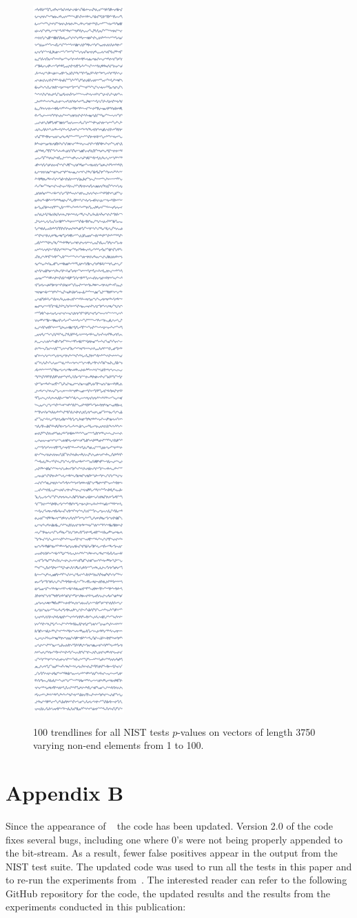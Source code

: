 \documentclass[oneside,12pt]{amsart}
\theoremstyle{definition}
\numberwithin{equation}{section}
\begin{document}
\begin{figure}[h!]
\centering
\caption{100 trendlines for all NIST tests $p$-values on vectors of length 3750 varying non-end elements from 1 to 100.}
\includegraphics[width=0.2\linewidth, height=1.2\linewidth]{./charts/varying-patterns-v2-alt.png}
\label{fig:patterns}
\end{figure}


\clearpage
\section{Appendix B}\label{second-appendix}

Since the appearance of ~\cite{ALDH} the code has been updated.  Version 2.0 of the code fixes several bugs, including one where 0's were not being properly appended to the bit-stream. As a result, fewer false positives appear in the output from the NIST test suite. The updated code was used to run all the tests in this paper and to re-run the experiments from~\cite{ALDH}. The interested reader can refer to the following GitHub repository for the code, the updated results and the results from the experiments conducted in this publication:
\end{document}
